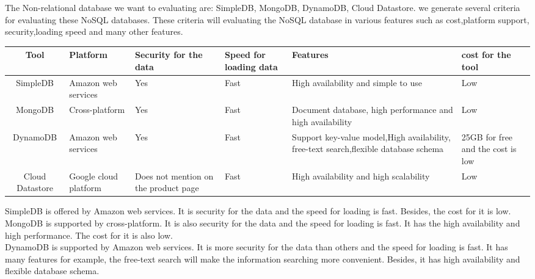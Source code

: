 \documentclass[10pt,draftclsnofoot,onecolumn,journal,compsoc]{IEEEtran}
\begin{document}
	 \noindent The Non-relational database we want to evaluating are: SimpleDB, MongoDB, DynamoDB, Cloud Datastore. we generate several criteria for evaluating these NoSQL databases. These criteria will evaluating the NoSQL database in various features such as cost,platform support, security,loading speed and many other features.
        
        \begin{table}[ht]
        \begin{tabular}{|c|p{2cm}|p{2cm}|p{1cm}|p{5cm}|p{3cm}|}
            \hline
            \textbf{Tool} & \textbf{Platform} & \textbf{Security for the data} & \textbf{Speed for loading data} & \textbf{Features} & \textbf{cost for the tool}\\
            \hline
            SimpleDB & Amazon web services & Yes & Fast & High availability and simple to use & Low \\
            \hline
            MongoDB & Cross-platform & Yes & Fast & Document database, high performance and high availability & Low \\
            \hline
            DynamoDB & Amazon web services & Yes & Fast & Support key-value model,High availability, free-text search,flexible database schema & 25GB for free and the cost is low\\
            \hline
             Cloud Datastore & Google cloud platform & Does not mention on the product page & Fast & High availability and high scalability & Low\\
            \hline
        \end{tabular}
        \end{table}
 
 	\noindent SimpleDB is offered by Amazon web services. It is security for the data and the speed for loading is fast. Besides, the cost for it is low.\\

        \noindent MongoDB is supported by cross-platform. It is also security for the data and the speed for loading is fast. It has the high availability and high performance. The cost for it is also low.\\

        \noindent DynamoDB is supported by Amazon web services. It is more security for the data than others and the speed for loading is fast. It has many features for example, the free-text search will make the information searching more convenient\cite{W5}. Besides, it has high availability and flexible database schema.\\
\end{document}
